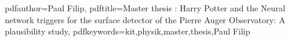 \newcommand{\thesisentopic}{Harry Potter and the Neural network triggers for the surface detector of the Pierre Auger Observatory: A plausibility study}

\newcommand{\thesisinstitute}{Institute for Astro Particle Physics}

\newcommand{\thesisauthor}{Paul Filip}
\newcommand{\thesisreviewerone}{Prof. Dr. Ralph Engel}
\newcommand{\thesisreviewertwo}{Prof. Dr. Guido Drexlin}

\newcommand{\thesistimestart}{01.04.2022}
\newcommand{\thesistimeend}{31.03.2022}
\newcommand{\thesistimehandin}{TBD}

\hypersetup
{
	pdfauthor={\thesisauthor},
	pdftitle={Master thesis : \thesisentopic},
	pdfkeywords={kit,physik,master,thesis,\thesisauthor}
}
